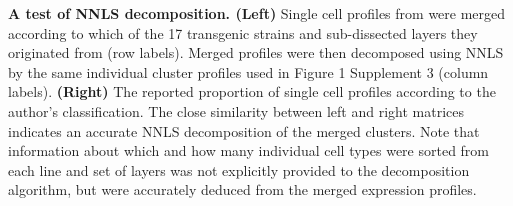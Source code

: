 \textbf{A test of NNLS decomposition. (Left)} Single cell profiles from \cite{Tasic_2016} were merged according to which of the 17 transgenic strains and sub-dissected layers they originated from (row labels). Merged profiles were then decomposed using NNLS by the same individual cluster profiles used in Figure 1 Supplement 3 (column labels). \textbf{(Right)} The reported proportion of single cell profiles according to the author's classification. The close similarity between left and right matrices indicates an accurate NNLS decomposition of the merged clusters. Note that information about which and how many individual cell types were sorted from each line and set of layers was not explicitly provided to the decomposition algorithm, but were accurately deduced from the merged expression profiles.